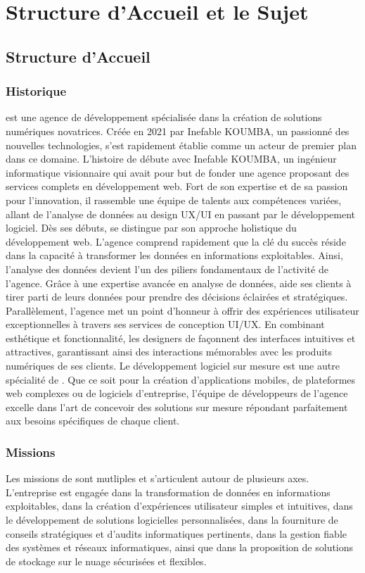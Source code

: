 \chapter{Structure d’Accueil et le Sujet}
\section{Structure d’Accueil}
\subsection{Historique}

\mazf est une agence de développement spécialisée dans la création de solutions
numériques novatrices. Créée en 2021 par Inefable KOUMBA, un passionné des nouvelles
technologies, \mazf s'est rapidement établie comme un acteur de premier plan dans ce domaine.
L'histoire de \mazf débute avec Inefable KOUMBA, un ingénieur informatique
visionnaire qui avait pour but de fonder une agence proposant des services complets
en développement web. Fort de son expertise et de sa passion pour l’innovation,
il rassemble une équipe de talents aux compétences variées, allant de l’analyse
de données au design UX/UI en passant par le développement logiciel.
Dès ses débuts, \mazf se distingue par son approche holistique du développement
web. L’agence comprend rapidement que la clé du succès réside dans la capacité à
transformer les données en informations exploitables. Ainsi, l’analyse des données
devient l’un des piliers fondamentaux de l’activité de l’agence. Grâce à une
expertise avancée en analyse de données, \mazf aide ses clients à tirer
parti de leurs données pour prendre des décisions éclairées et stratégiques.
Parallèlement, l’agence met un point d’honneur à offrir des expériences utilisateur
exceptionnelles à travers ses services de conception UI/UX. En combinant esthétique
et fonctionnalité, les designers de \mazf façonnent des interfaces intuitives
et attractives, garantissant ainsi des interactions mémorables avec les produits
numériques de ses clients. Le développement logiciel sur mesure est une autre
spécialité de \mazf. Que ce soit pour la création d’applications mobiles,
de plateformes web complexes ou de logiciels d’entreprise, l’équipe de développeurs
de l’agence excelle dans l’art de concevoir des solutions sur mesure répondant
parfaitement aux besoins spécifiques de chaque client.

\subsection{Missions}
Les missions de \firm sont mutliples et s’articulent autour de plusieurs axes. L’entreprise
est engagée dans la transformation de données en informations exploitables, dans
la création d’expériences utilisateur simples et intuitives, dans le développement de solutions
logicielles personnalisées, dans la fourniture de conseils stratégiques et d’audits
informatiques pertinents, dans la gestion fiable des systèmes et réseaux informatiques,
ainsi que dans la proposition de solutions de stockage sur le nuage sécurisées et flexibles.

